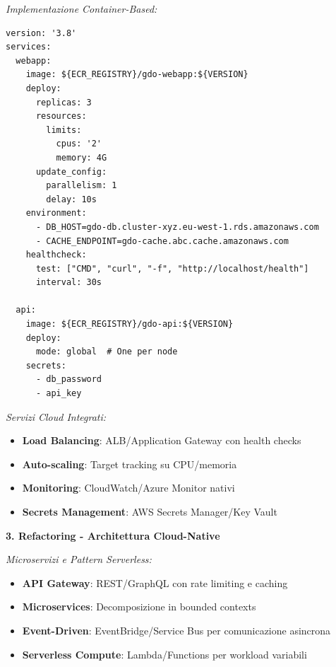 \textit{Implementazione Container-Based:}
\begin{lstlisting}[caption={Docker Compose per Replatforming},label={lst:replatform}]
version: '3.8'
services:
  webapp:
    image: ${ECR_REGISTRY}/gdo-webapp:${VERSION}
    deploy:
      replicas: 3
      resources:
        limits:
          cpus: '2'
          memory: 4G
      update_config:
        parallelism: 1
        delay: 10s
    environment:
      - DB_HOST=gdo-db.cluster-xyz.eu-west-1.rds.amazonaws.com
      - CACHE_ENDPOINT=gdo-cache.abc.cache.amazonaws.com
    healthcheck:
      test: ["CMD", "curl", "-f", "http://localhost/health"]
      interval: 30s
      
  api:
    image: ${ECR_REGISTRY}/gdo-api:${VERSION}
    deploy:
      mode: global  # One per node
    secrets:
      - db_password
      - api_key
\end{lstlisting}

\textit{Servizi Cloud Integrati:}
\begin{itemize}
    \item \textbf{Load Balancing}: ALB/Application Gateway con health checks
    \item \textbf{Auto-scaling}: Target tracking su CPU/memoria
    \item \textbf{Monitoring}: CloudWatch/Azure Monitor nativi
    \item \textbf{Secrets Management}: AWS Secrets Manager/Key Vault
\end{itemize}

\textbf{3. Refactoring - Architettura Cloud-Native}

\textit{Microservizi e Pattern Serverless:}
\begin{itemize}
    \item \textbf{API Gateway}: REST/GraphQL con rate limiting e caching
    \item \textbf{Microservices}: Decomposizione in bounded contexts
    \item \textbf{Event-Driven}: EventBridge/Service Bus per comunicazione asincrona
    \item \textbf{Serverless Compute}: Lambda/Functions per workload variabili
\end{itemize}

